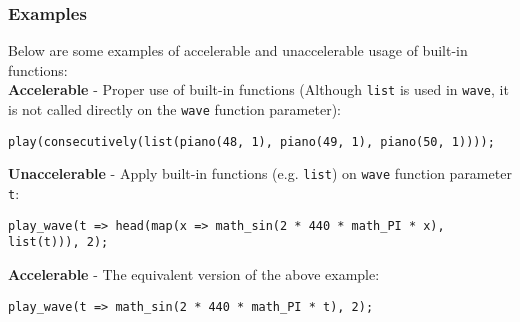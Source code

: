 \subsubsection*{Examples}

Below are some examples of accelerable and unaccelerable usage of built-in functions:\\

\textbf{Accelerable} - Proper use of built-in functions (Although \lstinline{list} is used in \lstinline{wave}, it is not called directly on the \lstinline{wave} function parameter):
\begin{verbatim}
play(consecutively(list(piano(48, 1), piano(49, 1), piano(50, 1))));
\end{verbatim}

\textbf{Unaccelerable} - Apply built-in functions (e.g. \lstinline{list}) on \lstinline{wave} function parameter \lstinline{t}:
\begin{verbatim}
play_wave(t => head(map(x => math_sin(2 * 440 * math_PI * x), list(t))), 2);
\end{verbatim}

\textbf{Accelerable} - The equivalent version of the above example:
\begin{verbatim}
play_wave(t => math_sin(2 * 440 * math_PI * t), 2);
\end{verbatim}
